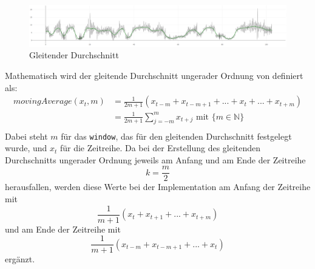 \begin{description}
\begin{figure}[h!]
\centering
\includegraphics[width=\textwidth]{gfx/movingAverage.png}
\caption{Gleitender Durchschnitt}
\label{fig:movingAverage}
\end{figure}
Mathematisch wird der gleitende Durchschnitt ungerader Ordnung von \cite{Bosch.2002} definiert als:
\begin{equation}
\label{eqn:moving-average}
    \begin{split}
        movingAverage(x_t,m)&=\frac{1}{2m+1}(x_{t-m}+x_{t-m+1}+...+x_t+...+x_{t+m})\\
&=\frac{1}{2m+1}\sum\limits_{j=-m}^mx_{t+j} \text{ mit }\{m\in \mathbb{N}\}\\
    \end{split}
\end{equation}
Dabei steht $m$ für das \texttt{window}, das für den gleitenden Durchschnitt festgelegt wurde, und $x_t$ für die Zeitreihe.
Da bei der Erstellung des gleitenden Durchschnitts ungerader Ordnung jeweils am Anfang und am Ende der Zeitreihe \[k=\frac{m}{2}\] herausfallen, werden diese Werte bei der Implementation am Anfang der Zeitreihe mit \[\frac{1}{m+1}(x_{t}+x_{t+1}+...+x_{t+m})\] und am Ende der Zeitreihe mit  \[\frac{1}{m+1}(x_{t-m}+x_{t-m+1}+...+x_t)\] ergänzt. \\\\


\end{description}
